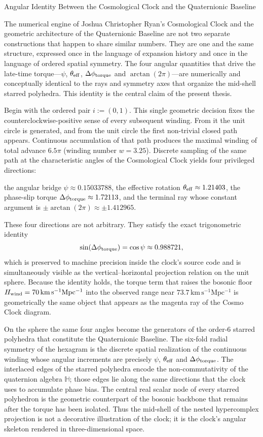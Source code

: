 Angular Identity Between the Cosmological Clock and the Quaternionic Baseline

The numerical engine of Joshua Christopher Ryan’s Cosmological Clock and the geometric architecture of the Quaternionic Baseline are not two separate constructions that happen to share similar numbers. They are one and the same structure, expressed once in the language of expansion history and once in the language of ordered spatial symmetry. The four angular quantities that drive the late-time torque—\(\psi\), \(\theta_{\rm eff}\), \(\Delta\phi_{\rm torque}\) and \(\arctan(2\pi)\)—are numerically and conceptually identical to the rays and symmetry axes that organize the mid-shell starred polyhedra. This identity is the central claim of the present thesis.

Begin with the ordered pair \(i:=(0,1)\). This single geometric decision fixes the counterclockwise-positive sense of every subsequent winding. From it the unit circle is generated, and from the unit circle the first non-trivial closed path appears. Continuous accumulation of that path produces the maximal winding of total advance \(6.5\pi\) (winding number \(w=3.25\)). Discrete sampling of the same path at the characteristic angles of the Cosmological Clock yields four privileged directions:

the angular bridge \(\psi\approx0.15033788\),
the effective rotation \(\theta_{\rm eff}\approx1.21403\),
the phase-slip torque \(\Delta\phi_{\rm torque}\approx1.72113\),
and the terminal ray whose constant argument is \(\pm\arctan(2\pi)\approx\pm1.412965\).

These four directions are not arbitrary. They satisfy the exact trigonometric identity
\[
\sin(\Delta\phi_{\rm torque})=\cos\psi\approx0.988721,
\]
which is preserved to machine precision inside the clock’s source code and is simultaneously visible as the vertical–horizontal projection relation on the unit sphere. Because the identity holds, the torque term that raises the bosonic floor \(H_{\rm wind}=70\,\mathrm{km\,s^{-1}Mpc^{-1}}\) into the observed range near \(73.7\,\mathrm{km\,s^{-1}Mpc^{-1}}\) is geometrically the same object that appears as the magenta ray of the Cosmo Clock diagram.

On the sphere the same four angles become the generators of the order-6 starred polyhedra that constitute the Quaternionic Baseline. The six-fold radial symmetry of the hexagram is the discrete spatial realization of the continuous winding whose angular increments are precisely \(\psi\), \(\theta_{\rm eff}\) and \(\Delta\phi_{\rm torque}\). The interlaced edges of the starred polyhedra encode the non-commutativity of the quaternion algebra \(\mathbb{H}\); those edges lie along the same directions that the clock uses to accumulate phase bias. The central real scalar node of every starred polyhedron is the geometric counterpart of the bosonic backbone that remains after the torque has been isolated. Thus the mid-shell of the nested hypercomplex projection is not a decorative illustration of the clock; it is the clock’s angular skeleton rendered in three-dimensional space.

